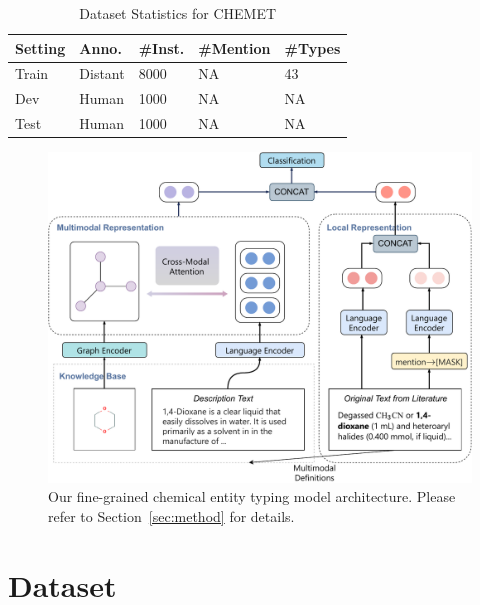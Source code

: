 
\begin{table}
	\caption{Dataset Statistics for CHEMET}
	\centering
	\begin{tabular}{lllll}
		
		\toprule
		Setting &Anno.& \#Inst. & \#Mention  & \#Types \\
		\midrule
		Train &Distant&   8000& NA&43\\
		Dev &Human&1000&NA&NA\\
		Test&Human&            1000&NA&NA \\
		\bottomrule
	\end{tabular}
	\label{datastats}
\end{table}



\begin{figure}[ht]
	\begin{center}
		\centerline{\includegraphics[width=2
			\columnwidth]{model_new.pdf}}
		\caption{Our fine-grained chemical entity typing model architecture. Please refer to Section~\ref{sec:method} for details. 
		}
		\label{fig:framework}
	\end{center}
	\vskip -0.2in
\end{figure}
\section{Dataset}
\label{datacollection}

